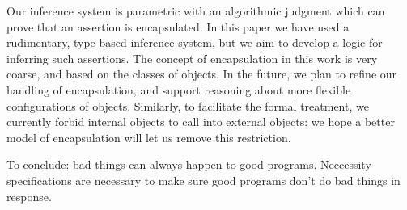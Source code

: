 Our inference system is parametric with an algorithmic judgment which
can prove that an assertion is encapsulated. In this paper we have
used a rudimentary, type-based inference system, but we aim to develop
a logic for inferring such assertions. The concept of encapsulation in
this work is very coarse, and based on the classes of objects. In the
future, we plan to refine our handling of encapsulation, and support
reasoning about more flexible configurations of objects.  Similarly,
to facilitate the formal treatment, we currently forbid internal
objects to call into external objects: we hope a better model of
encapsulation will let us remove this restriction.


To conclude: bad things can always happen to good programs. Neccessity
specifications are necessary to make sure good programs don't do bad
things in response.
